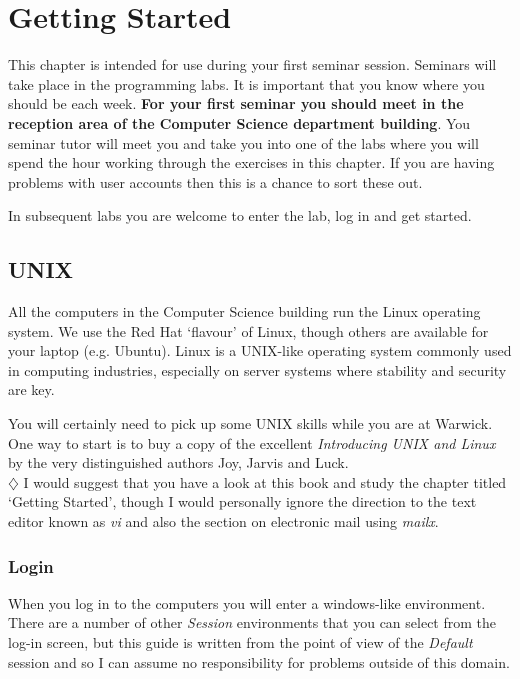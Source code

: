 \pagebreak
\section{Getting Started}

This chapter is intended for use during your first seminar session. Seminars 
will take place in the programming labs. It 
is important that you know where you should be each week. {\bf For your first 
seminar you should meet in the reception area of the Computer Science 
department building}. You seminar tutor will meet you and take you into 
one of the labs where you will spend the hour working through 
the exercises in this chapter. If you are having problems with user accounts 
then this is a chance to sort these out. 

In subsequent labs you are welcome to enter the lab, log in and get started.

\subsection{UNIX}

All the computers in the Computer Science building run the Linux operating 
system. We use the Red Hat `flavour' of Linux, though others are available for
your laptop (e.g. Ubuntu). Linux is a UNIX-like operating system commonly used
in computing industries, especially on server systems where stability and security
are key. 

You will certainly need to pick up some UNIX skills while you are at 
Warwick. One way to start is to buy a copy of the excellent 
{\em Introducing UNIX and Linux} by the very distinguished authors Joy, 
Jarvis and Luck. \\

$\diamondsuit$ 
I would suggest that you have a look at this book and study the chapter titled
`Getting Started', though I would personally ignore the 
direction to the text editor known as {\em vi} and also the section on 
electronic mail using {\em mailx}.

\subsubsection{Login}

When you log in to the computers you will enter a windows-like
environment. There are a number of other {\em Session} environments that you
can select from the log-in screen, but this guide is written from the 
point of view of the {\em Default} session and so I can assume no 
responsibility for problems outside of this domain. 


